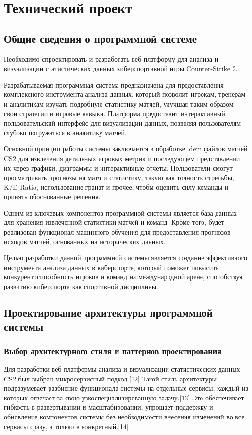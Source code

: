 \newsection
\section{Технический проект}
\subsection{Общие сведения о программной системе}

Необходимо спроектировать и разработать веб-платформу для анализа и визуализации статистических данных киберспортивной игры Counter-Strike 2.

Разрабатываемая программная система предназначена для предоставления комплексного инструмента анализа данных, который позволит игрокам, тренерам и аналитикам изучать подробную статистику матчей, улучшая таким образом свои стратегии и игровые навыки. Платформа предоставит интерактивный пользовательский интерфейс для визуализации данных, позволяя пользователям глубоко погружаться в аналитику матчей.

Основной принцип работы системы заключается в обработке .dem файлов матчей CS2 для извлечения детальных игровых метрик и последующем представлении их через графики, диаграммы и интерактивные отчеты. Пользователи смогут просматривать прогнозы на матч и статистику, такую как точность стрельбы, K/D Ratio, использование гранат и прочее, чтобы оценить силу команды и принять обоснованные решения.

Одним из ключевых компонентов программной системы является база данных для хранения извлеченной статистики матчей и команд. Кроме того, будет реализован функционал машинного обучения для предоставления прогнозов исходов матчей, основанных на исторических данных.

Целью разработки данной программной системы является создание эффективного инструмента анализа данных в киберспорте, который поможет повысить конкурентоспособность игроков и команд на международной арене, способствуя развитию киберспорта как спортивной дисциплины.


\subsection{Проектирование архитектуры программной системы}
\subsubsection{Выбор архитектурного стиля и паттернов проектирования}
Для разработки веб-платформы анализа и визуализации статистических данных CS2 был выбран микросервисный подход.[12] Такой стиль архитектуры подразумевает разбиение функционала системы на отдельные сервисы, каждый из которых отвечает за свою узкоспециализированную задачу.[13] Это обеспечивает гибкость в развертывании и масштабировании, упрощает поддержку и обновление компонентов системы без необходимости внесения изменений во все сервисы сразу, а только в конкретный.[14]

